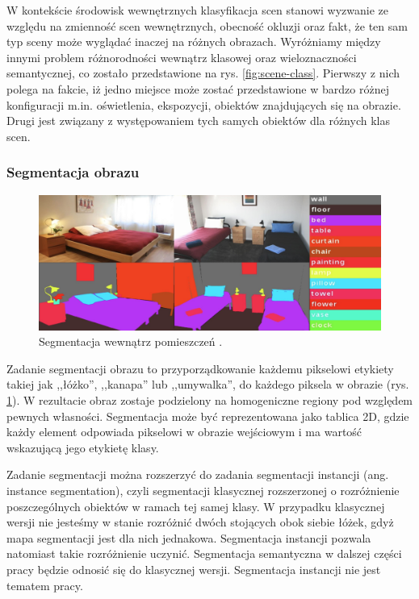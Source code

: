 W kontekście środowisk wewnętrznych klasyfikacja scen stanowi wyzwanie ze względu na zmienność scen wewnętrznych, obecność okluzji oraz fakt, że ten sam typ sceny może wyglądać inaczej na różnych obrazach. Wyróżniamy między innymi problem różnorodności wewnątrz klasowej oraz wieloznaczności semantycznej, co zostało przedstawione na rys. \ref{fig:scene-class}. Pierwszy z nich polega na fakcie, iż jedno miejsce może zostać przedstawione w bardzo różnej konfiguracji m.in. oświetlenia, ekspozycji, obiektów znajdujących się na obrazie. Drugi jest związany z występowaniem tych samych obiektów dla różnych klas scen.

\subsubsection{Segmentacja obrazu}
\begin{figure}[ht!]
    \includegraphics[width=\textwidth]{img/segment.png}
    \caption{Segmentacja wewnątrz pomieszczeń \cite{zhang2018context}.}
    \label{fig:segment}
  \end{figure}
  
Zadanie segmentacji obrazu to przyporządkowanie każdemu pikselowi etykiety takiej jak ,,łóżko'', ,,kanapa'' lub ,,umywalka'', do każdego piksela w obrazie (rys. \ref{fig:segment}). W rezultacie obraz zostaje podzielony na homogeniczne regiony pod względem pewnych własności. Segmentacja może być reprezentowana jako tablica 2D, gdzie każdy element odpowiada pikselowi w obrazie wejściowym i ma wartość wskazującą jego etykietę klasy.

Zadanie segmentacji można rozszerzyć do zadania segmentacji instancji (ang. instance segmentation), czyli segmentacji klasycznej rozszerzonej o rozróżnienie poszczególnych obiektów w ramach tej samej klasy. W przypadku klasycznej wersji nie jesteśmy w stanie rozróżnić dwóch stojących obok siebie łóżek, gdyż mapa segmentacji jest dla nich jednakowa. Segmentacja instancji pozwala natomiast takie rozróżnienie uczynić. Segmentacja semantyczna w dalszej części pracy będzie odnosić się do klasycznej wersji. Segmentacja instancji nie jest tematem pracy.


